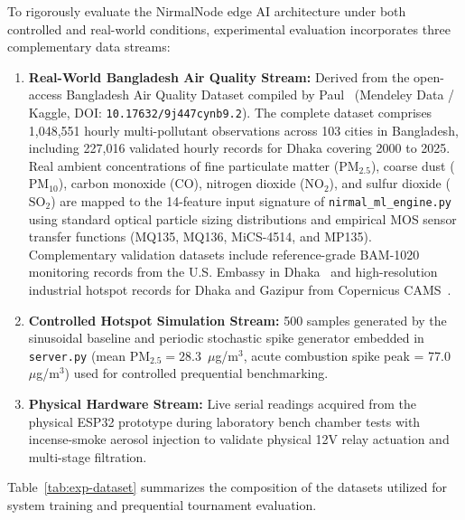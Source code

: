 To rigorously evaluate the NirmalNode edge AI architecture under both controlled and real-world conditions, experimental evaluation incorporates three complementary data streams:
\begin{enumerate}
    \item \textbf{Real-World Bangladesh Air Quality Stream:} Derived from the open-access Bangladesh Air Quality Dataset compiled by Paul~\cite{paul2026bangladesh} (Mendeley Data / Kaggle, DOI: \texttt{10.17632/9j447cynb9.2}). The complete dataset comprises 1,048,551 hourly multi-pollutant observations across 103 cities in Bangladesh, including 227,016 validated hourly records for Dhaka covering 2000 to 2025. Real ambient concentrations of fine particulate matter ($\text{PM}_{2.5}$), coarse dust ($\text{PM}_{10}$), carbon monoxide ($\text{CO}$), nitrogen dioxide ($\text{NO}_2$), and sulfur dioxide ($\text{SO}_2$) are mapped to the 14-feature input signature of \texttt{nirmal\_ml\_engine.py} using standard optical particle sizing distributions and empirical MOS sensor transfer functions (MQ135, MQ136, MiCS-4514, and MP135). Complementary validation datasets include reference-grade BAM-1020 monitoring records from the U.S. Embassy in Dhaka~\cite{usembassy2022dhaka} and high-resolution industrial hotspot records for Dhaka and Gazipur from Copernicus CAMS~\cite{cams2024bangladesh}.
    \item \textbf{Controlled Hotspot Simulation Stream:} 500 samples generated by the sinusoidal baseline and periodic stochastic spike generator embedded in \texttt{server.py} (mean $\text{PM}_{2.5} = 28.3$~$\mu$g/m$^3$, acute combustion spike peak = 77.0~$\mu$g/m$^3$) used for controlled prequential benchmarking.
    \item \textbf{Physical Hardware Stream:} Live serial readings acquired from the physical ESP32 prototype during laboratory bench chamber tests with incense-smoke aerosol injection to validate physical 12V relay actuation and multi-stage filtration.
\end{enumerate}

Table~\ref{tab:exp-dataset} summarizes the composition of the datasets utilized for system training and prequential tournament evaluation.


